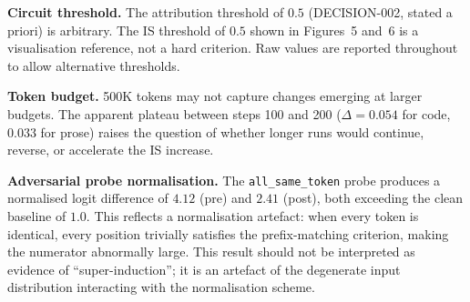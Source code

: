 \textbf{Circuit threshold.}
The attribution threshold of $0.5$ (DECISION-002, stated a priori) is
arbitrary. The IS threshold of $0.5$ shown in Figures~5 and~6 is a
visualisation reference, not a hard criterion. Raw values are reported
throughout to allow alternative thresholds.

\textbf{Token budget.}
500K tokens may not capture changes emerging at larger budgets. The apparent
plateau between steps 100 and 200 ($\Delta = 0.054$ for code, $0.033$ for
prose) raises the question of whether longer runs would continue, reverse,
or accelerate the IS increase.

\textbf{Adversarial probe normalisation.}
The \texttt{all\_same\_token} probe produces a normalised logit difference of
$4.12$ (pre) and $2.41$ (post), both exceeding the clean baseline of $1.0$.
This reflects a normalisation artefact: when every token is identical, every
position trivially satisfies the prefix-matching criterion, making the
numerator abnormally large. This result should not be interpreted as evidence
of ``super-induction''; it is an artefact of the degenerate input
distribution interacting with the normalisation scheme.
